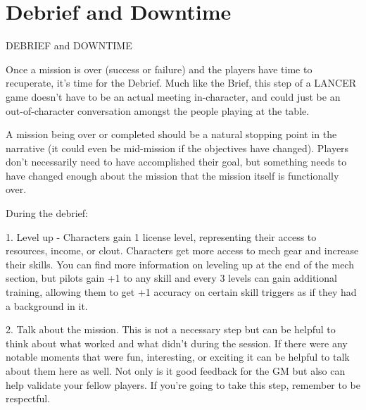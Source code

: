 \section{Debrief and Downtime}

                      DEBRIEF and DOWNTIME


Once a mission is over (success or failure) and the players have time to recuperate, it’s time for
the Debrief. Much like the Brief, this step of a LANCER game doesn’t have to be an actual
meeting in-character, and could just be an out-of-character conversation amongst the people
playing at the table.


A mission being over or completed should be a natural stopping point in the narrative (it could
even be mid-mission if the objectives have changed). Players don’t necessarily need to have
accomplished their goal, but something needs to have changed enough about the mission that
the mission itself is functionally over.


During the debrief:

	        1. Level up - Characters gain 1 license level, representing their access to resources,
income, or clout. Characters get more access to mech gear and increase their skills. You can find
more information on leveling up at the end of the mech section, but pilots gain +1 to any skill and
every 3 levels can gain additional training, allowing them to get +1 accuracy on certain skill
triggers as if they had a background in it.

	        2. Talk about the mission. This is not a necessary step but can be helpful to think about
what worked and what didn’t during the session. If there were any notable moments that were
fun, interesting, or exciting it can be helpful to talk about them here as well. Not only is it good
feedback for the GM but also can help validate your fellow players. If you’re going to take this
step, remember to be respectful.

